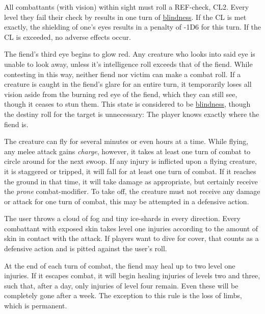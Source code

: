 {
    All combattants (with vision) within sight must roll a REF-check, CL2. Every level they fail their check by
    results in one turn of \hyperref[modifier:blindness]{blindness}. If the CL is met exactly, the shielding of one's eyes results in a penalty
    of -1D6 for this turn. If the CL is exceeded, no adverse effects occur.
}

{
    The fiend's third eye begins to glow red. Any creature who looks into said eye is unable to look away, unless
    it's intelligence roll exceeds that of the fiend. While contesting in this way, neither fiend nor victim can 
    make a combat roll. If a creature is caught in the fiend's glare for an entire turn, it temporarily loses all 
    vision \textendash aside from the burning red eye of the fiend, which they can still see, though it ceases to
    stun them. This state is considered to be \hyperref[modifier:blindness]{blindness}, though the destiny roll 
    for the target is unnecessary: The player knows exactly where the fiend is.
}

{
    The creature can fly for several minutes or even hours at a time. While flying, any melee attack gains \textit{charge}, 
    however, it takes at least one turn of combat to circle around for the next swoop. If any injury is inflicted upon a 
    flying creature, it is staggered or tripped,
    it will fall for at least one turn of combat. If it reaches the ground in that time, it will take damage as appropriate,
    but certainly receive the \textit{prone} combat-modifier. To take off, the creature must not receive any damage
    or attack for one turn of combat, this may be attempted in a defensive action.
}

{
    The user throws a cloud of fog and tiny ice-shards in every direction.
    Every combattant with exposed skin takes level one injuries according to
    the amount of skin in contact with the attack. If players want to dive for
    cover, that counts as a defensive action and is pitted against the user's roll.
}

{
    At the end of each turn of combat, the fiend may heal up to two level one injuries.
    If it escapes combat, it will begin healing injuries of levels two and three, such that,
    after a day, only injuries of level four remain. Even these will be completely gone after a
    week. The exception to this rule is the loss of limbs, which is permanent.
}

